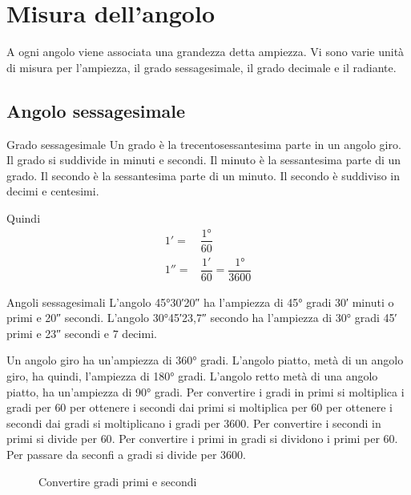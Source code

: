 \section{Misura dell'angolo}
\label{sec:MisuraAngoloGonio}

A ogni angolo viene associata una grandezza detta ampiezza. Vi sono varie unità di misura per l'ampiezza, il grado sessagesimale, il grado decimale e il radiante. 
\subsection{Angolo sessagesimale}
\begin{definizionet}{Grado sessagesimale}{}
Un grado è la trecentosessantesima parte in un angolo giro. Il grado si suddivide in minuti e secondi. Il minuto è la sessantesima parte di un grado. Il secondo è la sessantesima parte di un minuto. Il secondo è suddiviso in decimi e centesimi.
\end{definizionet}
 Quindi
 \begin{align*}
\ang{;1;}=&\dfrac{\ang{1}}{60}\\
\ang{;;1}=&\dfrac{\ang{;1;}}{60}=\dfrac{\ang{1}}{3600}
 \end{align*}
\begin{esempiot}{Angoli sessagesimali}{}
L'angolo \ang{45;30;20} ha l'ampiezza di \ang{45} gradi \ang{;30;} minuti o primi e \ang{;;20} secondi. L'angolo \ang{30;45;23,7} secondo ha l'ampiezza di \ang{30} gradi \ang{;45;} primi e \ang{;;23} secondi e $7$ decimi.
\end{esempiot}
Un angolo giro ha un'ampiezza di \ang{360} gradi. L'angolo piatto, metà di un angolo giro, ha quindi, l'ampiezza di \ang{180} gradi. L'angolo retto metà di una angolo piatto, ha un'ampiezza di \ang{90} gradi. Per convertire i gradi in primi si moltiplica i gradi  per $\num{60}$ per ottenere i secondi dai primi si moltiplica per  $\num{60}$ per ottenere i secondi dai gradi si moltiplicano i gradi per  $\num{3600}$. Per convertire i secondi in primi si divide per  $\num{60}$. Per convertire i primi in gradi si dividono i primi per  $\num{60}$. Per passare da seconfi a gradi si divide per  $\num{3600}$.
\begin{figure} %
	\centering
	
	\caption{Convertire gradi primi e secondi}\label{fig:Convertiregradiprimisecondi}
\end{figure}
